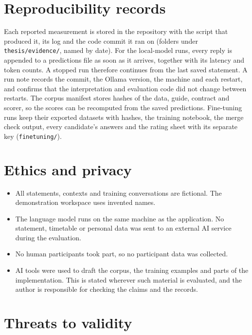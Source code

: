 \section{Reproducibility records}\label{reproducibility-records}

Each reported measurement is stored in the repository with the script that produced it, its log and the code commit it ran on (folders under \texttt{thesis/evidence/}, named by date). For the local-model runs, every reply is appended to a predictions file as soon as it arrives, together with its latency and token counts. A stopped run therefore continues from the last saved statement. A run note records the commit, the Ollama version, the machine and each restart, and confirms that the interpretation and evaluation code did not change between restarts. The corpus manifest stores hashes of the data, guide, contract and scorer, so the scores can be recomputed from the saved predictions. Fine-tuning runs keep their exported datasets with hashes, the training notebook, the merge check output, every candidate's answers and the rating sheet with its separate key (\texttt{finetuning/}).

\section{Ethics and privacy}\label{ethics-privacy-and-consent}

\begin{itemize}
\item All statements, contexts and training conversations are fictional. The demonstration workspace uses invented names.
\item The language model runs on the same machine as the application. No statement, timetable or personal data was sent to an external AI service during the evaluation.
\item No human participants took part, so no participant data was collected.
\item AI tools were used to draft the corpus, the training examples and parts of the implementation. This is stated wherever such material is evaluated, and the author is responsible for checking the claims and the records.
\end{itemize}

\section{Threats to validity}\label{threats-to-validity}

